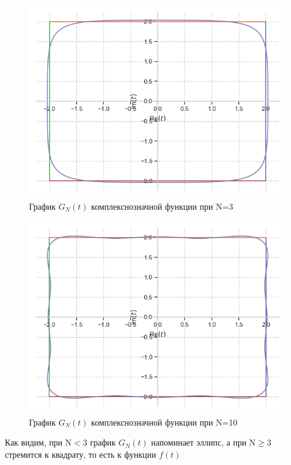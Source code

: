 \documentclass[a4paper, 16pt]{article}
\begin{document}
\begin{figure}[!htb]
    \centering
    \includegraphics[scale=0.8]{fur_cf_n=3.png}
    \captionsetup{skip=0pt}
    \caption{График $G_N(t)$ комплекснозначной функции при N=3}
    \label{Рис:38}
\end{figure}
\begin{figure}[!htb]
    \centering
    \includegraphics[scale=0.8]{fur_cf_n=10.png}
    \captionsetup{skip=0pt}
    \caption{График $G_N(t)$ комплекснозначной функции при N=10}
    \label{Рис:39}
\end{figure}


\noindent Как видим, при N$<$3 график $G_N(t)$ напоминает эллипс, а
при N$\geq3$ стремится к квадрату, то есть к функции $f(t)$
\end{document}
